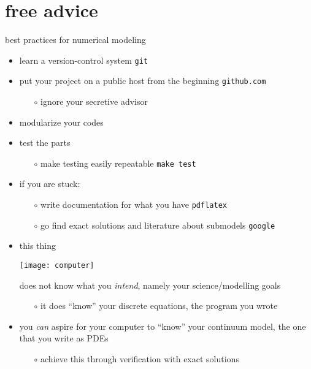 \section{free advice}

\begin{frame}{best practices for numerical modeling}

\begin{itemize}
\item learn a version-control system \hfill \alert{\texttt{git}}
\item put your project on a public host from the beginning \hfill \alert{\texttt{github.com}}
  \begin{itemize}
  \item[$\circ$] ignore your secretive advisor
  \end{itemize}
\item modularize your codes
\item test the parts
  \begin{itemize}
  \item[$\circ$] make testing easily repeatable \hfill \alert{\texttt{make test}}
  \end{itemize}
\item if you are stuck:
  \begin{itemize}
  \item[$\circ$] write documentation for what you have \hfill \alert{\texttt{pdflatex}}
  \item[$\circ$] go find exact solutions and literature about submodels \hfill \alert{\texttt{google}}
  \end{itemize}
\end{itemize}
\end{frame}


\begin{frame}{}
\begin{itemize}
\item this thing

\vspace{-10mm}
\begin{center}
\texttt{[image: computer]}
\end{center}
\alert{does not know what you \emph{intend}}, namely your science/modelling goals
   \begin{itemize}
   \item[$\circ$] it does ``know'' your discrete equations, the program you wrote
   \end{itemize}

\bigskip
\item you \emph{can} aspire for your computer to ``know'' your continuum model, the one that you write as PDEs
   \begin{itemize}
   \item[$\circ$] achieve this through verification with exact solutions
   \end{itemize}
\end{itemize}

\end{frame}
